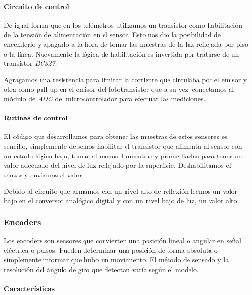 \paragraph{Circuito de control}
\label{h_sensado_piso_circuito}

De igual forma que en los tel\'emetros utilizamos un transistor como habilitaci\'on de la tensi\'on de alimentaci\'on en el sensor.
Esto nos dio la posibilidad de encenderlo y apagarlo a la hora de tomar las muestras de la luz reflejada por piso o la l\'inea.
Nuevamente la l\'ogica de habilitaci\'on es invertida por tratarse de un transistor \emph{BC327}.

Agragamos una resistencia para limitar la corriente que circulaba por el emisor y otra como pull-up en el emisor del fototransistor
que a su vez, conectamos al m\'odulo de \emph{ADC} del microcontrolador para efectuar las mediciones.

\paragraph{Rutinas de control}
\label{h_sensado_piso_rutinas}

El c\'odigo que desarrollamos para obtener las muestras de estos sensores es sencillo, simplemente debemos habilitar el
transistor que alimenta al sensor con un estado l\'ogico bajo, tomar al menos $4$ muestras y promediarlas para tener un
valor adecuado del nivel de luz reflejado por la superficie.
Deshabilitamos el sensor y enviamos el valor.

Debido al circuito que armamos con un nivel alto de reflexi\'on leemos un valor bajo en el conversor anal\'ogico digital y
con un nivel bajo de luz, un valor alto.

\subsubsection{Encoders}
\label{h_sensado_encoder}

Los encoders son sensores que convierten una posici\'on lineal o angular en se\~nal el\'ectrica o pulsos.
Pueden determinar una posici\'on de forma absoluta o simplemente informar que hubo un movimiento.
El m\'etodo de sensado y la resoluci\'on del \'angulo de giro que detectan var\'ia seg\'un el modelo.

\paragraph{Caracter\'isticas}
\label{h_sensado_encoder_caracteristicas}

